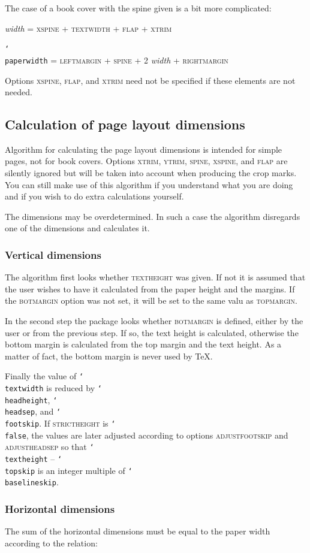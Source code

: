 \documentclass[11pt]{article}
\def\opt#1{\texorpdfstring{\textmd{\textsc{#1}}}{#1}}
\DeclareRobustCommand\cmd[1]{\texttt{\char`\\#1}}
\begin{document}
The case of a book cover with the spine given is a bit more complicated:

\vb
\textit{width} = \opt{xspine} + \opt{textwidth} + \opt{flap} + \opt{xtrim}

\cmd{paperwidth} = \opt{leftmargin} + \opt{spine} + 2 \textit{width} + \opt{rightmargin}

\vb \noindent
Options \opt{xspine}, \opt{flap}, and \opt{xtrim} need not be specified if these elements are not
needed.

\subsection{Calculation of page layout dimensions}\label{calc.pg.layout}
Algorithm for calculating the page layout dimensions is intended for simple pages, not for book
covers. Options \opt{xtrim}, \opt{ytrim}, \opt{spine}, \opt{xspine}, and \opt{flap} are silently
ignored but will be taken into account when producing the crop marks. You can still make use of
this algorithm if you understand what you are doing and if you wish to do extra calculations
yourself.

The dimensions may be overdetermined. In such a case the algorithm disregards one of the dimensions
and calculates it.

\subsubsection{Vertical dimensions}\label{vert.dim}
The algorithm first looks whether \opt{textheight} was given. If not it is assumed that the user
wishes to have it calculated from the paper height and the margins. If the \opt{botmargin} option was
not set, it will be set to the same valu as \opt{topmargin}.

In the second step the package looks whether \opt{botmargin} is defined, either by the user or from
the previous step. If so, the text height is calculated, otherwise the bottom margin is calculated
from the top margin and the text height. As a matter of fact, the bottom margin is never used by
\TeX.

Finally the value of \cmd{textwidth} is reduced by \cmd{headheight}, \cmd{headsep}, and
\cmd{footskip}. If \opt{strictheight} is \cmd{false}, the values are later adjusted according to
options \opt{adjustfootskip} and \opt{adjustheadsep} so that \cmd{textheight} -- \cmd{topskip} is
an integer multiple of \cmd{baselineskip}.

\subsubsection{Horizontal dimensions}
The sum of the horizontal dimensions must be equal to the paper width according to the relation:
\end{document}
